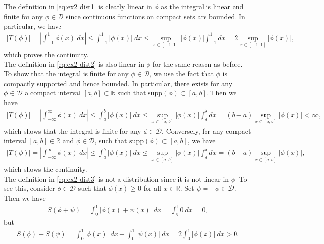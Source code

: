 \documentclass[11pt]{article}
\begin{document}
\begin{solution}
    The definition in \eqref{eq:ex2 dist1} is clearly linear in $\phi$ as the integral is linear
     and finite for any $\phi \in \mathcal{D}$ since continuous functions on compact sets are bounded. In particular, we have
     \begin{align}
            |T(\phi)| = \left| \int_{-1}^{1} \phi(x) \ dx \right| \leq \int_{-1}^{1} |\phi(x)| \ dx \leq \sup_{x \in [-1,1]} |\phi(x)| \int_{-1}^{1} dx = 2 \sup_{x \in [-1,1]} |\phi(x)|,
     \end{align}
     which proves the continuity.\\

    The definition in \eqref{eq:ex2 dist2} is also linear in $\phi$ for the same reason as before. To show that the integral is finite for any $\phi \in \mathcal{D}$, we use the fact that $\phi$ is compactly supported and hence bounded.
     In particular, there exists for any $\phi \in \mathcal{D}$ a compact interval $[a, b] \subset \mathbb{R}$ such that $\mathrm{supp}(\phi) \subset [a, b]$. Then we have
    \begin{align}
        |T(\phi)| = \left| \int_{-\infty}^{\infty} \phi(x) \ dx \right| \leq \int_{a}^{b} |\phi(x)| \ dx \leq \sup_{x \in [a,b]} |\phi(x)| \int_{a}^{b} dx = (b-a) \sup_{x \in [a,b]} |\phi(x)| < \infty,
    \end{align}
    which shows that the integral is finite for any $\phi \in \mathcal D$. Conversely, for any compact interval $[a, b] \in \mathbb{R}$ and $\phi \in \mathcal{D}$, such that $\mathrm{supp}(\phi) \subset [a, b]$, we have
    \begin{align}
        |T(\phi)| = \left| \int_{-\infty}^{\infty} \phi(x) \ dx \right| \leq \int_{a}^{b} |\phi(x)| \ dx \leq \sup_{x \in [a,b]} |\phi(x)| \int_{a}^{b} dx = (b-a) \sup_{x \in [a,b]} |\phi(x)|,
    \end{align}
    which shows the continuity.
    \\

    The definition in \eqref{eq:ex2 dist3} is not a distribution since it is not linear in $\phi$. 
    To see this, consider $\phi \in \mathcal{D}$ such that $\phi(x) \geq 0$ for all $x \in \mathbb{R}$. Set $\psi = -\phi \in \mathcal D$. Then we have
    \begin{align}
        S(\phi + \psi) = \int_0^1 |\phi(x) + \psi(x)| \ dx = \int_0^1 0 \ dx = 0,
    \end{align}
    but
    \begin{align}
        S(\phi) + S(\psi) = \int_0^1 |\phi(x)| \ dx + \int_0^1 |\psi(x)| \ dx = 2 \int_0^1 |\phi(x)| \ dx > 0.
    \end{align}
\end{solution}
\end{document}
